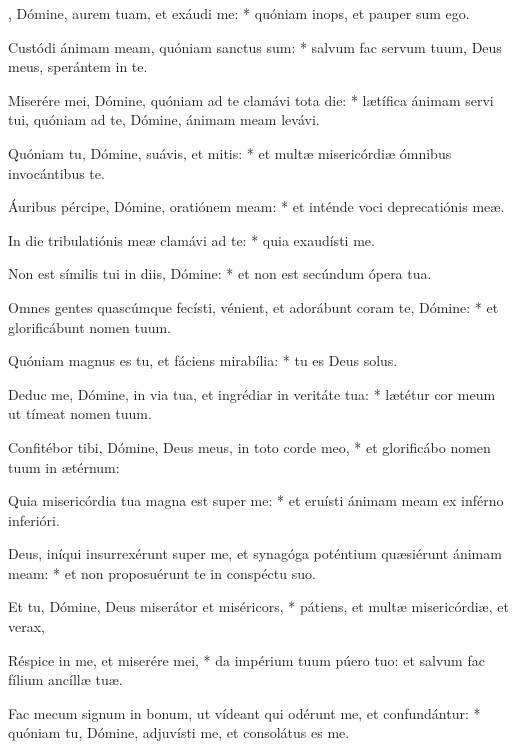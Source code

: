 \begin{psalmus}

    , Dómine, aurem tuam, et exáudi me: * quóniam inops, et pauper sum ego.

    Custódi ánimam meam, quóniam sanctus sum: * salvum fac servum tuum, Deus meus, sperántem in te.

    Miserére mei, Dómine, quóniam ad te clamávi tota die: * lætífica ánimam servi tui, quóniam ad te, Dómine, ánimam meam levávi.

    Quóniam tu, Dómine, suávis, et mitis: * et multæ misericórdiæ ómnibus invocántibus te.

    Áuribus pércipe, Dómine, oratiónem meam: * et inténde voci deprecatiónis meæ.

    In die tribulatiónis meæ clamávi ad te: * quia exaudísti me.

    Non est símilis tui in diis, Dómine: * et non est secúndum ópera tua.

    Omnes gentes quascúmque fecísti, vénient, et adorábunt coram te, Dómine: * et glorificábunt nomen tuum.

    Quóniam magnus es tu, et fáciens mirabília: * tu es Deus solus.

    Deduc me, Dómine, in via tua, et ingrédiar in veritáte tua: * lætétur cor meum ut tímeat nomen tuum.

    Confitébor tibi, Dómine, Deus meus, in toto corde meo, * et glorificábo nomen tuum in ætérnum:

    Quia misericórdia tua magna est super me: * et eruísti ánimam meam ex inférno inferióri.

    Deus, iníqui insurrexérunt super me, et synagóga poténtium quæsiérunt ánimam meam: * et non proposuérunt te in conspéctu suo.

    Et tu, Dómine, Deus miserátor et miséricors, * pátiens, et multæ misericórdiæ, et verax,

    Réspice in me, et miserére mei, * da impérium tuum púero tuo: et salvum fac fílium ancíllæ tuæ.

    Fac mecum signum in bonum, ut vídeant qui odérunt me, et confundántur: * quóniam tu, Dómine, adjuvísti me, et consolátus es me.

\end{psalmus}
